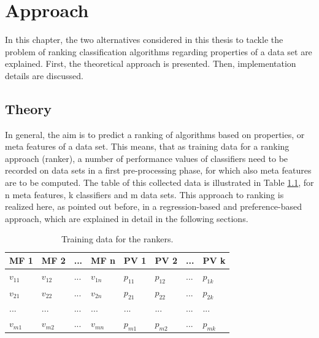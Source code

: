 %
\chapter{Approach}
\label{sec:approach}

In this chapter, the two alternatives considered in this thesis to tackle the problem of ranking classification algorithms regarding properties of a data set are explained. First, the theoretical approach is presented. Then, implementation details are discussed.

\section{Theory}

In general, the aim is to predict a ranking of algorithms based on properties, or meta features of a data set. This means, that as training data for a ranking approach (ranker), a number of performance values of classifiers need to be recorded on data sets in a first pre-processing phase, for which also meta features are to be computed. The table of this collected data is illustrated in Table \ref{tab:performanceValues}, for n meta features, k classifiers and m data sets. This approach to ranking is realized here, as pointed out before, in a regression-based and preference-based approach, which are explained in detail in the following sections.

\begin{table}[h]
\centering
	\begin{tabularx}{\textwidth}{X | X | X | X | X | X | X | X}
		MF 1			& MF 2		& ... 	& MF n		& PV 1 		& PV 2 		&	...	&	PV k 		\\ \hline
		$v_{11}$		& $v_{12}$	& ...	& $v_{1n}$	& $p_{11}$	& $p_{12}$	& 	...	&	$p_{1k}$		\\ 
		$v_{21}$		& $v_{22}$	& ...	& $v_{2n}$	& $p_{21}$	& $p_{22}$	& 	...	&	$p_{2k}$		\\ 
		...			& ...		& ...	& ...		& ...		& ...		&	...	&	...			\\ 
		$v_{m1}$		& $v_{m2}$	& ... 	& $v_{mn}$	& $p_{m1}$	& $p_{m2}$	& 	...	&	$p_{mk}$			 
	\end{tabularx}
	\caption{Training data for the rankers.}
	\label{tab:performanceValues}
\end{table}

